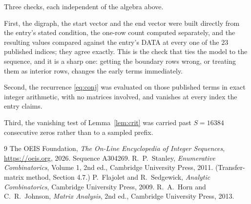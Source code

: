 \documentclass[11pt,a4paper]{article}
\theoremstyle{plain}
\theoremstyle{definition}
\begin{document}
Three checks, each independent of the algebra above.

First, the digraph, the start vector and the end vector were built directly from the
entry's stated condition, the one-row count computed separately, and the resulting values
compared against the entry's DATA at every one of the $23$ published indices; they
agree exactly. This is the check that ties the model to the sequence, and it is a sharp one:
getting the boundary rows wrong, or treating them as interior rows, changes the early terms
immediately.

Second, the recurrence \eqref{eq:conj} was evaluated on those published terms in exact
integer arithmetic, with no matrices involved, and vanishes at every index the entry claims.

Third, the vanishing test of Lemma~\ref{lem:crit} was carried past $S=16384$ consecutive
zeros rather than to a sampled prefix.

\begin{thebibliography}{9}
 The OEIS Foundation, \emph{The On-Line Encyclopedia of Integer
Sequences}, \url{https://oeis.org}, 2026. Sequence A304269.
 R.~P.~Stanley, \emph{Enumerative Combinatorics}, Volume 1, 2nd ed.,
Cambridge University Press, 2011. (Transfer-matrix method, Section 4.7.)
 P.~Flajolet and R.~Sedgewick, \emph{Analytic Combinatorics}, Cambridge
University Press, 2009.
 R.~A.~Horn and C.~R.~Johnson, \emph{Matrix Analysis}, 2nd ed., Cambridge
University Press, 2013.
\end{thebibliography}
\end{document}
